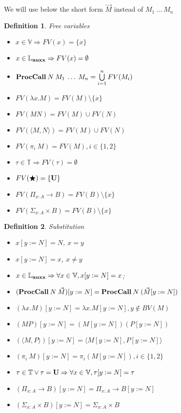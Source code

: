 \documentclass[a4paper]{article}
\newtheorem{defin}{Definition}
\begin{document}
\vspace{\baselineskip}

We will use below the short form $\vec{M}$ instead of $M_1 \: \dots \: M_n$

\begin{defin} Free variables

  \begin{itemize}
    \item $x \in \mathbb{V} \Rightarrow FV(x) = \{ x \}$
    \item $x \in \mathbb{L}_{\bf auxx} \Rightarrow FV(x) = \emptyset$
    \item ${\bf ProcCall \:} N \: M_1 \: \dots \: M_n = \bigcup \limits_{i = 1}^n FV(M_i)$
    \item $FV(\lambda x. M) = FV(M) \setminus \{ x \}$
    \item $FV(M N) = FV(M) \cup FV(N)$
    \item $FV(\langle M , N \rangle) = FV(M) \cup FV(N)$
    \item $FV (\pi_i \: M) = FV(M), i \in \{ 1, 2\}$
    \item $\tau \in \mathbb{T} \Rightarrow FV (\tau) = \emptyset$
    \item $FV (\bigstar) = \{ {\bf U} \}$
    \item $FV(\Pi_{x : A} \to B) = FV(B) \setminus \{ x \}$
    \item $FV(\Sigma_{x : A} \times B) = FV(B) \setminus \{ x \}$
  \end{itemize}
\end{defin}

\begin{defin} Substitution
  \begin{itemize}
    \item $x [y := N] = N$, $x = y$
    \item $x [y := N] = x$, $x \neq y$
    \item $x \in \mathbb{L}_{\bf auxx} \Rightarrow \forall x \in \mathbb{V}, x [y := N] = x$;
    \item $({\bf ProcCall \:} N \: \vec{M}) [y := N] = {\bf ProcCall \:} N \: (\vec{M} [y := N])$
    \item $(\lambda x. M) [y := N] = \lambda x. M [y := N], y \notin BV(M)$
    \item $(M P) [y := N] = (M [y := N]) (P [y := N])$
    \item $(\langle M , P \rangle) [y := N] = \langle M [y := N], P [y := N] \rangle$
    \item $(\pi_i \: M) [y := N] = \pi_i (M [y := N]), i \in \{ 1, 2\}$
    \item $\tau \in \mathbb{T} \vee \tau = {\bf U} \Rightarrow \forall x \in \mathbb{V}, \tau [y := N] = \tau$
    \item $(\Pi_{x : A} \to B) [y := N] = \Pi_{x : A} \to B [y := N]$
    \item $(\Sigma_{x : A} \times B) [y := N] = \Sigma_{x : A} \times B$
  \end{itemize}
\end{defin}
\end{document}
